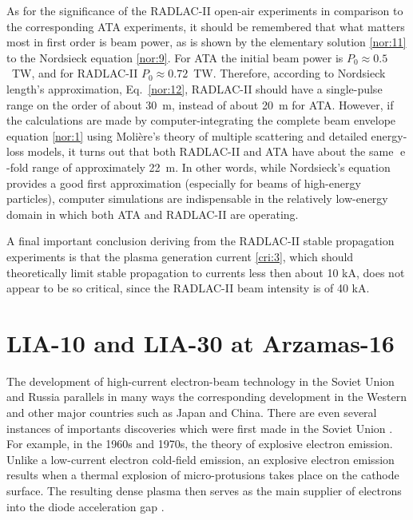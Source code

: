 \documentclass [12pt,a4paper,     ]{report} %
\newcommand{\e  }{\operatorname{e}}   %
\begin{document}
As for the significance of the RADLAC-II open-air experiments in comparison to the corresponding ATA experiments, it should be remembered that what matters most in first order is beam power, as is shown by the elementary solution \eqref{nor:11} to the Nordsieck equation \eqref{nor:9}. For ATA the initial beam power is $P_0 \approx 0.5$~TW, and for RADLAC-II $P_0 \approx 0.72$~TW.  Therefore, according to Nordsieck length's approximation, Eq.~\eqref{nor:12}, RADLAC-II should have a single-pulse range on the order of about 30~m, instead of about 20~m for ATA.  However, if the calculations are made by computer-integrating the complete beam envelope equation \eqref{nor:1} using Moli\`ere's theory of multiple scattering \cite{BETHE1953-} and detailed energy-loss models, it turns out that both RADLAC-II and ATA have about the same $\e$-fold range of approximately 22~m.  In other words, while Nordsieck's equation provides a good first approximation (especially for beams of high-energy particles), computer simulations are indispensable in the relatively low-energy domain in which both ATA and RADLAC-II are operating.

A final important conclusion deriving from the RADLAC-II stable propagation experiments is that the plasma generation current \eqref{cri:3}, which should theoretically limit stable propagation to currents less then about 10 kA, does not appear to be so critical, since the RADLAC-II beam intensity is of 40 kA.


\section{LIA-10 and LIA-30 at Arzamas-16}
\label{lia:0}

The development of high-current electron-beam technology in the Soviet Union and Russia parallels in many ways the corresponding development in the Western and other major countries such as Japan and China.  There are even several instances of importants discoveries which were first made in the Soviet Union \cite{KASSE1975-, WELLS1986-, BYSTR1995B}.  For example, in the 1960s and 1970s, the theory of explosive electron emission. Unlike a low-current electron cold-field emission, an explosive electron emission results when a thermal explosion of micro-protusions takes place on the cathode surface.  The resulting dense plasma then serves as the main supplier of electrons into the diode acceleration gap \cite[p.67]{BYSTR1995B}.
\end{document}
